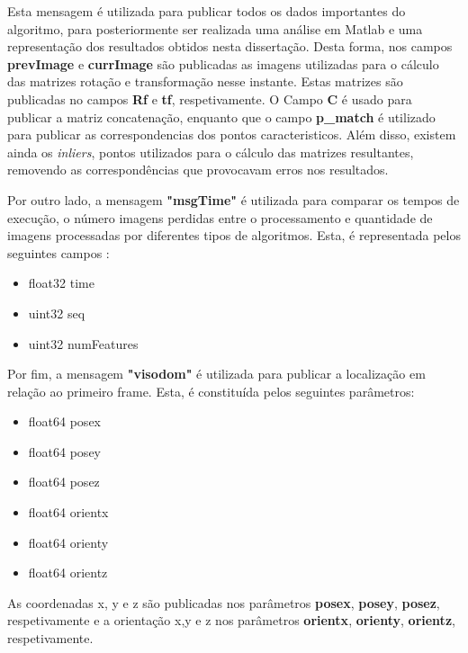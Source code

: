 Esta mensagem é utilizada para publicar todos os dados importantes do algoritmo, para posteriormente ser realizada uma análise em Matlab e uma representação dos resultados obtidos nesta dissertação. 
Desta forma, nos campos \textbf{prevImage} e \textbf{currImage} são publicadas as imagens utilizadas para o cálculo das matrizes rotação e transformação nesse instante. Estas matrizes são publicadas no campos \textbf{Rf} e \textbf{tf}, respetivamente. 
O Campo \textbf{C} é usado para publicar a matriz concatenação, enquanto que o campo  \textbf{p\_match} é utilizado para publicar as correspondencias dos pontos caracteristicos. Além disso, existem ainda os \textit{inliers}, pontos utilizados para o cálculo das matrizes resultantes, removendo as correspondências que provocavam erros nos resultados.  


Por outro lado, a mensagem \textbf{"msgTime"} é utilizada para comparar os tempos de execução, o número imagens perdidas entre o processamento e quantidade de imagens processadas por diferentes tipos de algoritmos. Esta, é representada pelos seguintes campos :
\begin{itemize}
	\item float32 time
	
	\item uint32 seq
	\item uint32 numFeatures
\end{itemize}


Por fim, a mensagem \textbf{"visodom"} é utilizada para publicar a localização em relação ao primeiro frame. Esta, é constituída pelos seguintes parâmetros:

\begin{itemize}
	
	\item float64 posex
	\item float64 posey
	\item float64 posez
	
	\item float64 orientx
	\item float64 orienty
	\item float64 orientz
	
\end{itemize}

As coordenadas x, y e z são publicadas nos parâmetros \textbf{posex}, \textbf{posey}, \textbf{posez}, respetivamente e a orientação x,y e z nos parâmetros \textbf{orientx}, \textbf{orienty}, \textbf{orientz}, respetivamente. 


